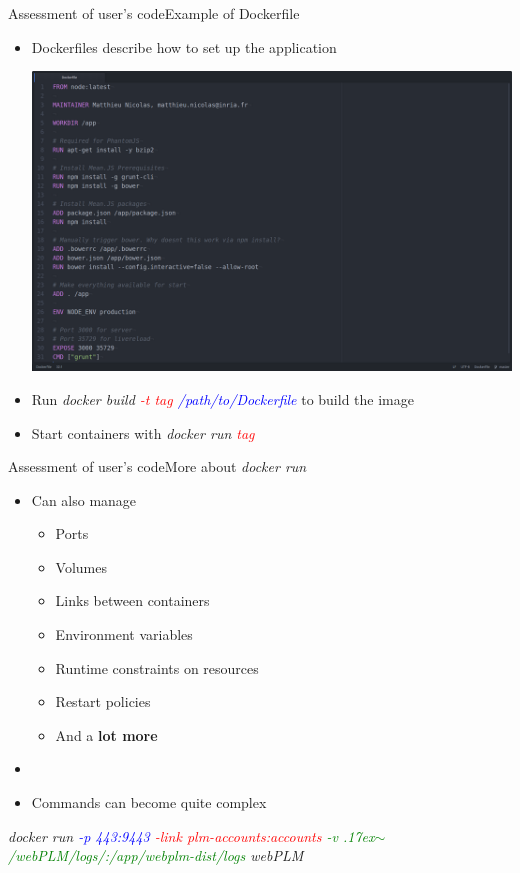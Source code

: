 \documentclass{beamer}
\begin{document}
\begin{frame}{Assessment of user's code}{Example of Dockerfile}
  \begin{itemize}
  \item {
    Dockerfiles describe how to set up the application
  }
  \begin{center}
    \includegraphics[scale=0.12]{img/dockerfile.png}
  \end{center}
  \item {
    Run \emph{docker build \textcolor{red}{-t tag} \textcolor{blue}{/path/to/Dockerfile}} to build  the image
  }
  \item {
    Start containers with \emph{docker run \textcolor{red}{tag}}
  }
  \end{itemize}
\end{frame}

\begin{frame}{Assessment of user's code}{More about \emph{docker run}}
  \begin{itemize}
  \item {
    Can also manage
    \begin{itemize}
    \item {
      Ports
      \pause
    }
    \item {
      Volumes
      \pause
    }
    \item {
      Links between containers
      \pause
    }
    \item {
      Environment variables
    }
    \item {
      Runtime constraints on resources
    }
    \item {
      Restart policies
    }
    \item {
      And a \textbf{lot more}
      \pause
    }
    \end{itemize}
  }
  \item[~]
  \item {
    Commands can become quite complex
  }
  \end{itemize}
  \begin{center} {
    \emph{docker run \textcolor{blue}{-p 443:9443} \textcolor{red}{-link plm-accounts:accounts} \textcolor{green}{-v \raise.17ex\hbox{$\scriptstyle\sim$}/webPLM/logs/:/app/webplm-dist/logs} webPLM}
  }
  \end{center}
\end{frame}
\end{document}
